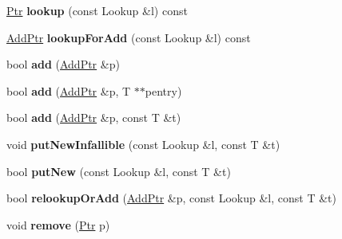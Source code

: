 \begin{DoxyCompactItemize}
\item 
\hypertarget{classjs_1_1detail_1_1_hash_table_a433f1c764c7d754ad496e5d0a04d243b}{\hyperlink{classjs_1_1detail_1_1_hash_table_1_1_ptr}{Ptr} {\bfseries lookup} (const Lookup \&l) const }\label{classjs_1_1detail_1_1_hash_table_a433f1c764c7d754ad496e5d0a04d243b}

\item 
\hypertarget{classjs_1_1detail_1_1_hash_table_a29716675791302783a483ee83b1b3c8f}{\hyperlink{classjs_1_1detail_1_1_hash_table_1_1_add_ptr}{Add\-Ptr} {\bfseries lookup\-For\-Add} (const Lookup \&l) const }\label{classjs_1_1detail_1_1_hash_table_a29716675791302783a483ee83b1b3c8f}

\item 
\hypertarget{classjs_1_1detail_1_1_hash_table_a8107a954216f10623bed24f16a32b2e5}{bool {\bfseries add} (\hyperlink{classjs_1_1detail_1_1_hash_table_1_1_add_ptr}{Add\-Ptr} \&p)}\label{classjs_1_1detail_1_1_hash_table_a8107a954216f10623bed24f16a32b2e5}

\item 
\hypertarget{classjs_1_1detail_1_1_hash_table_ad983e60328806a937cb0d80ec1986510}{bool {\bfseries add} (\hyperlink{classjs_1_1detail_1_1_hash_table_1_1_add_ptr}{Add\-Ptr} \&p, T $\ast$$\ast$pentry)}\label{classjs_1_1detail_1_1_hash_table_ad983e60328806a937cb0d80ec1986510}

\item 
\hypertarget{classjs_1_1detail_1_1_hash_table_acef08b3535ebd3ba4a92187a40b5be5c}{bool {\bfseries add} (\hyperlink{classjs_1_1detail_1_1_hash_table_1_1_add_ptr}{Add\-Ptr} \&p, const T \&t)}\label{classjs_1_1detail_1_1_hash_table_acef08b3535ebd3ba4a92187a40b5be5c}

\item 
\hypertarget{classjs_1_1detail_1_1_hash_table_a910d89f0b45a40ad2782278f5e9a0a8b}{void {\bfseries put\-New\-Infallible} (const Lookup \&l, const T \&t)}\label{classjs_1_1detail_1_1_hash_table_a910d89f0b45a40ad2782278f5e9a0a8b}

\item 
\hypertarget{classjs_1_1detail_1_1_hash_table_abb09e6e249c7aa8d6c5d8ea09b790bd7}{bool {\bfseries put\-New} (const Lookup \&l, const T \&t)}\label{classjs_1_1detail_1_1_hash_table_abb09e6e249c7aa8d6c5d8ea09b790bd7}

\item 
\hypertarget{classjs_1_1detail_1_1_hash_table_a4c70a4f969c90b0bb890d00ea517ff0d}{bool {\bfseries relookup\-Or\-Add} (\hyperlink{classjs_1_1detail_1_1_hash_table_1_1_add_ptr}{Add\-Ptr} \&p, const Lookup \&l, const T \&t)}\label{classjs_1_1detail_1_1_hash_table_a4c70a4f969c90b0bb890d00ea517ff0d}

\item 
\hypertarget{classjs_1_1detail_1_1_hash_table_a67fc36bb65a94e96ea2281b8c00b2538}{void {\bfseries remove} (\hyperlink{classjs_1_1detail_1_1_hash_table_1_1_ptr}{Ptr} p)}\label{classjs_1_1detail_1_1_hash_table_a67fc36bb65a94e96ea2281b8c00b2538}

\end{DoxyCompactItemize}
